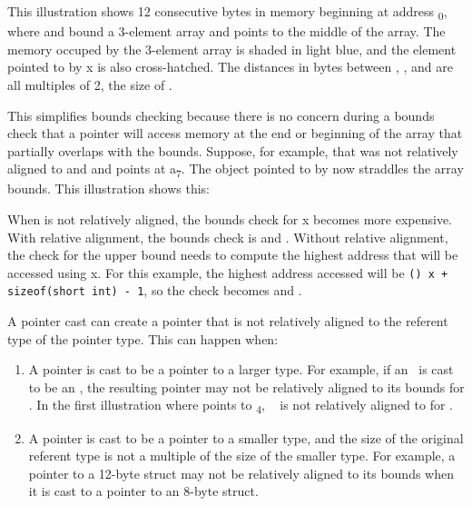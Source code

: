 This illustration shows 12 consecutive bytes in memory beginning at
address \textsubscript{0}, where  and  bound a
3-element array and  points to the middle of the array. The
memory occuped by the 3-element array is shaded in light blue, and the
element pointed to by x is also cross-hatched. The distances in bytes
between , , and  are all multiples of 2,
the size of .
\begin{center}
\end{center}

This simplifies bounds checking because there is no concern during a
bounds check that a pointer will access memory at the end or beginning
of the array that partially overlaps with the bounds. Suppose, for
example, that  was not relatively aligned to  and
 and points at a\textsubscript{7}. The object pointed to by
 now straddles the array bounds. This illustration shows this:
\begin{center}
\end{center}

When  is not relatively aligned, the bounds check for x
becomes more expensive. With relative alignment, the bounds check is
 and . Without relative
alignment, the check for the upper bound needs to compute the highest
address that will be accessed using x. For this example, the highest
address accessed will be
\lstinline|(|\arrayptrchar\lstinline|) x + sizeof(short int) - 1|, so the check becomes
 and .

A pointer cast can create a pointer that is not relatively aligned to
the referent type of the pointer type. This can happen when:

\begin{enumerate}
\item
  A pointer is cast to be a pointer to a larger type. For example, if an
  \ is cast to be an
  \arrayptrint , the resulting pointer
  may not be relatively aligned to its bounds for . In the
  first illustration where  points to \textsubscript{4},
  \arrayptrint\  is not relatively
  aligned to  for .
\item
  A pointer is cast to be a pointer to a smaller type, and the size of
  the original referent type is not a multiple of the size of the
  smaller type. For example, a pointer to a 12-byte struct may not be
  relatively aligned to its bounds when it is cast to a pointer to an
  8-byte struct.
\end{enumerate}

